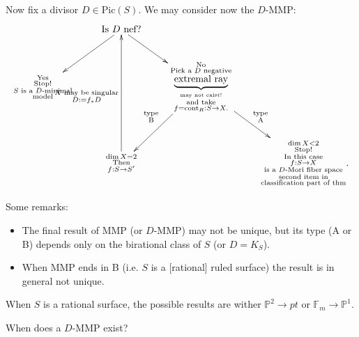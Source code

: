 Now fix a divisor $D \in \text{Pic}(S)$.
We may consider now the $D$-MMP:
$$
\xymatrix{
&\text{Is $D$ nef?}
\ar[dl]\ar[dr]\\
\substack{\text{Yes} \\ \text{Stop!}\\
\text{$S$ is a $D$-minimal}\\\text{model}}
&  &
\substack{\text{No} \\
\text{Pick a $D$ negative}\\
\underbrace{\text{extremal ray}}_{\text{may
not exist!}}\\
\text{and take}\\
f=\text{cont}_R:S \to X.}
\ar[dr]^{\substack{\text{type} \\\text{A}}}
\ar[dl]_{\substack{\text{type} \\
\text{B}}}\\
&
\substack{\dim X=2 \\
\text{Then} \\
f:S \to S'}
\ar[uu]^{\substack{
X\text{ may be singular}\\
D:=f_* D}}
&&
\substack{\dim X <2 \\
\text{Stop!}\\
\text{In this case}\\
f:S \to X\\
\text{is a $D$-Mori fiber space}\\
\text{second item in}\\
\text{classification part of thm}}.
}
$$

Some remarks:
\begin{itemize}
\item The final result of MMP (or $D$-MMP)
may not be unique,
but its type (A or B)
depends only on the birational class of $S$
(or  $D=K_S$).

\item When MMP ends in B
(i.e.  $S$ is a [rational] ruled surface)
the result is in general not unique.
\end{itemize}

\begin{example}
\label{example-mmp-rational-surface}
When $S$ is a rational surface,
the possible results are wither
$\mathbb{P}^2 \to pt$
or
$\mathbb{F}_m \to \mathbb{P}^1$.
\end{example}


\medskip\noindent
When does a $D$-MMP exist?

